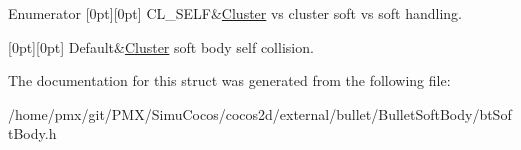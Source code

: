 \begin{DoxyEnumFields}{Enumerator}
[0pt][0pt]{}\mbox{\label{structbtSoftBody_1_1fCollision_afeb40bef0380b8db7e9e5628cc5f08d5a71505ee64a4a976707c73ec67cfcd533}} 
C\+L\+\_\+\+S\+E\+LF&\hyperlink{structbtSoftBody_1_1Cluster}{Cluster} vs cluster soft vs soft handling. \\
\hline

[0pt][0pt]{}\mbox{\label{structbtSoftBody_1_1fCollision_afeb40bef0380b8db7e9e5628cc5f08d5a1c6fb7a4f36642982c053815889133e5}} 
Default&\hyperlink{structbtSoftBody_1_1Cluster}{Cluster} soft body self collision. \\
\hline

\end{DoxyEnumFields}


The documentation for this struct was generated from the following file\+:\begin{DoxyCompactItemize}
\item 
/home/pmx/git/\+P\+M\+X/\+Simu\+Cocos/cocos2d/external/bullet/\+Bullet\+Soft\+Body/bt\+Soft\+Body.\+h\end{DoxyCompactItemize}
